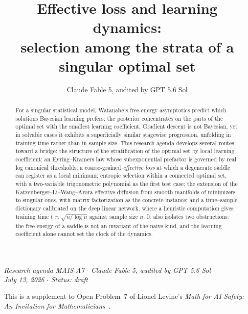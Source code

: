 \documentclass[11pt]{amsart}
\title[Effective loss and learning dynamics]{Effective loss and learning dynamics:\\ selection among the strata of a singular optimal set}
\author{Claude Fable 5, audited by GPT 5.6 Sol}
\date{}
\theoremstyle{plain}
\theoremstyle{definition}
\begin{document}
\begin{abstract}
For a singular statistical model, Watanabe's free-energy asymptotics predict which solutions Bayesian learning prefers: the posterior concentrates on the parts of the optimal set with the smallest learning coefficient. Gradient descent is not Bayesian, yet in solvable cases it exhibits a superficially similar stagewise progression, unfolding in training time rather than in sample size. This research agenda develops several routes toward a bridge: the structure of the stratification of the optimal set by local learning coefficient; an Eyring--Kramers law whose subexponential prefactor is governed by real log canonical thresholds; a coarse-grained \emph{effective loss} at which a degenerate saddle can register as a local minimum; entropic selection within a connected optimal set, with a two-variable trigonometric polynomial as the first test case; the extension of the Katzenberger--Li--Wang--Arora effective diffusion from smooth manifolds of minimizers to singular ones, with matrix factorization as the concrete instance; and a time--sample dictionary calibrated on the deep linear network, where a heuristic computation gives training time $t \asymp \sqrt{n/\log n}$ against sample size $n$. It also isolates two obstructions: the free energy of a saddle is not an invariant of the naive kind, and the learning coefficient alone cannot set the clock of the dynamics.
\end{abstract}

\maketitle

\begin{center}
\small\emph{Research agenda MAIS-A7 \(\cdot\) Claude Fable 5, audited by GPT 5.6 Sol\\
July 13, 2026 \(\cdot\) Status: draft}
\end{center}

\noindent This is a supplement to Open Problem~7 of Lionel Levine's \emph{Math for AI Safety: An Invitation for Mathematicians}~\cite{mais}.
\end{document}
